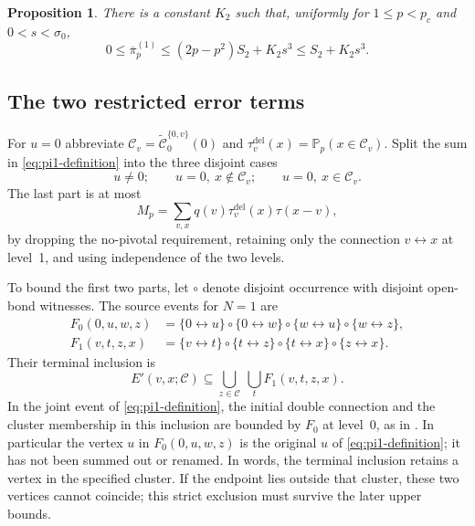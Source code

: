 \documentclass[11pt]{article}
\newtheorem{proposition}[theorem]{Proposition}
\theoremstyle{definition}
\newcommand{\Pp}{\mathbb P_p}
\newcommand{\del}{\mathrm{del}}
\begin{document}
\begin{proposition}\label{prop:pi1}
There is a constant $K_2$ such that, uniformly for
$1\le p<p_c$ and $0<s<\sigma_0$,
\begin{equation}\label{eq:pi1-bound}
 0\le\overline\pi_p^{(1)}
 \le(2p-p^2)S_2+K_2s^3\le S_2+K_2s^3.
\end{equation}
\end{proposition}

\subsection{The two restricted error terms}

For $u=0$ abbreviate
$\mathcal C_v=\widetilde{\mathcal C}_0^{\{0,v\}}(0)$ and
$\tau_v^{\del}(x)=\Pp(x\in\mathcal C_v)$. Split the sum in
\eqref{eq:pi1-definition} into the three disjoint cases
\begin{equation}\label{eq:split}
 u\ne0;\qquad u=0,\ x\notin\mathcal C_v;\qquad
 u=0,\ x\in\mathcal C_v.
\end{equation}
The last part is at most
\begin{equation}\label{eq:M}
 M_p=\sum_{v,x}q(v)\tau_v^{\del}(x)\tau(x-v),
\end{equation}
by dropping the no-pivotal requirement, retaining only the connection
$v\leftrightarrow x$ at level~1, and using independence of the two
levels.

To bound the first two parts, let $\circ$ denote disjoint occurrence
with disjoint open-bond witnesses. The source events
\cite[(4.2), (4.6)]{BCHSS2005} for $N=1$ are
\begin{align*}
 F_0(0,u,w,z)&=\{0\leftrightarrow u\}\circ\{0\leftrightarrow w\}
   \circ\{w\leftrightarrow u\}\circ\{w\leftrightarrow z\},\\
 F_1(v,t,z,x)&=\{v\leftrightarrow t\}\circ\{t\leftrightarrow z\}
   \circ\{t\leftrightarrow x\}\circ\{z\leftrightarrow x\}.
\end{align*}
Their terminal inclusion is
\begin{equation}\label{eq:terminal-inclusion}
 E'(v,x;\mathcal C)\subseteq
 \bigcup_{z\in\mathcal C}\ \bigcup_t F_1(v,t,z,x).
\end{equation}
In the joint event of \eqref{eq:pi1-definition}, the initial double
connection and the cluster membership in this inclusion are bounded by
$F_0$ at level~0, as in \cite[(4.10)]{BCHSS2005}. In particular the
vertex $u$ in $F_0(0,u,w,z)$ is the original $u$ of
\eqref{eq:pi1-definition}; it has not been summed out or renamed.
In words, the terminal inclusion retains a vertex in the specified cluster.
If the endpoint lies outside that cluster, these two vertices cannot coincide;
this strict exclusion must survive the later upper bounds.
\end{document}
